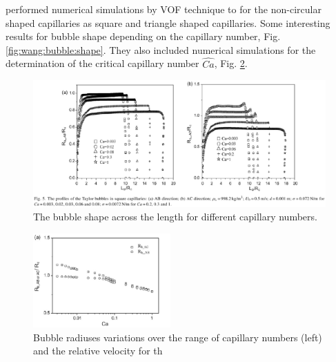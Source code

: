 \documentclass{article}
\begin{document}
\citet{wang-non-circular} performed numerical simulations by VOF technique to for the non-circular
shaped capillaries as square and triangle shaped capillaries. Some interesting results for bubble
shape depending on the capillary number, Fig. \ref{fig:wang:bubble:shape}. They also included
numerical simulations for the determination of the critical capillary number $\hat{Ca}$, Fig.
\ref{fig:wang:critical:capillary}. 
\begin{figure}
\includegraphics[width=\textwidth]{Figures/wang_bubble_shape.eps}
\caption{The bubble shape across the length for different capillary numbers.
\label{fig:wong:bubble:shape}}
\end{figure}
\begin{figure}
\includegraphics[width=0.47\textwidth]{Figures/wang_critical_capillary.eps}\hfill
\caption{Bubble radiuses variations over the range of capillary numbers (left) and the relative
velocity for th  \label{fig:wang:critical:capillary}}
\end{figure}
\end{document}
